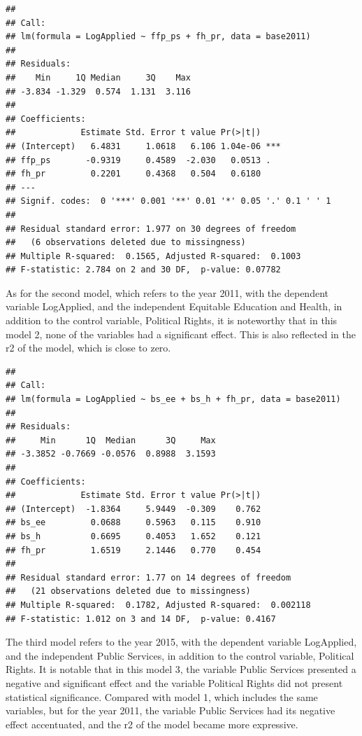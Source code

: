 \documentclass[]{elsarticle} %
\begin{document}
\begin{verbatim}
## 
## Call:
## lm(formula = LogApplied ~ ffp_ps + fh_pr, data = base2011)
## 
## Residuals:
##    Min     1Q Median     3Q    Max 
## -3.834 -1.329  0.574  1.131  3.116 
## 
## Coefficients:
##             Estimate Std. Error t value Pr(>|t|)    
## (Intercept)   6.4831     1.0618   6.106 1.04e-06 ***
## ffp_ps       -0.9319     0.4589  -2.030   0.0513 .  
## fh_pr         0.2201     0.4368   0.504   0.6180    
## ---
## Signif. codes:  0 '***' 0.001 '**' 0.01 '*' 0.05 '.' 0.1 ' ' 1
## 
## Residual standard error: 1.977 on 30 degrees of freedom
##   (6 observations deleted due to missingness)
## Multiple R-squared:  0.1565, Adjusted R-squared:  0.1003 
## F-statistic: 2.784 on 2 and 30 DF,  p-value: 0.07782
\end{verbatim}

As for the second model, which refers to the year 2011, with the
dependent variable LogApplied, and the independent Equitable Education
and Health, in addition to the control variable, Political Rights, it is
noteworthy that in this model 2, none of the variables had a significant
effect. This is also reflected in the r2 of the model, which is close to
zero.

\begin{verbatim}
## 
## Call:
## lm(formula = LogApplied ~ bs_ee + bs_h + fh_pr, data = base2011)
## 
## Residuals:
##     Min      1Q  Median      3Q     Max 
## -3.3852 -0.7669 -0.0576  0.8988  3.1593 
## 
## Coefficients:
##             Estimate Std. Error t value Pr(>|t|)
## (Intercept)  -1.8364     5.9449  -0.309    0.762
## bs_ee         0.0688     0.5963   0.115    0.910
## bs_h          0.6695     0.4053   1.652    0.121
## fh_pr         1.6519     2.1446   0.770    0.454
## 
## Residual standard error: 1.77 on 14 degrees of freedom
##   (21 observations deleted due to missingness)
## Multiple R-squared:  0.1782, Adjusted R-squared:  0.002118 
## F-statistic: 1.012 on 3 and 14 DF,  p-value: 0.4167
\end{verbatim}

The third model refers to the year 2015, with the dependent variable
LogApplied, and the independent Public Services, in addition to the
control variable, Political Rights. It is notable that in this model 3,
the variable Public Services presented a negative and significant effect
and the variable Political Rights did not present statistical
significance. Compared with model 1, which includes the same variables,
but for the year 2011, the variable Public Services had its negative
effect accentuated, and the r2 of the model became more expressive.
\end{document}
